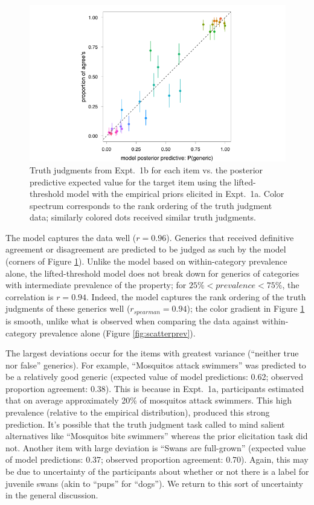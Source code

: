 \documentclass[10pt,letterpaper]{article}
\begin{document}
\begin{figure}
\centering
    \includegraphics[width=0.8\columnwidth]{tj_n100_tjVsPostpred}
    \caption{Truth judgments from Expt.~1b for each item vs. the posterior predictive expected value for the target item using the lifted-threshold model with the empirical priors elicited in Expt.~1a. Color spectrum corresponds to the rank ordering of the truth judgment data; similarly colored dots received similar truth judgments.}
  \label{fig:modeldataScatter}
\end{figure}

The model captures the data well ($r=0.96$). 
Generics that received definitive agreement or disagreement are predicted to be judged as such by the model (corners of Figure \ref{fig:modeldataScatter}). Unlike the model based on within-category prevalence alone, the lifted-threshold model does not break down for generics of categories with intermediate prevalence of the property; for $ 25\% < prevalence < 75\%$, the correlation is $r=0.94$. Indeed, the model captures the rank ordering of the truth judgments of these generics well ($r_{spearman} = 0.94$); the color gradient in Figure \ref{fig:modeldataScatter} is smooth, unlike what is observed when comparing the data against within-category prevalence alone (Figure \ref{fig:scatterprev}). 

The largest deviations occur for the items with greatest variance (``neither true nor false'' generics). For example, ``Mosquitos attack swimmers'' was predicted to be a relatively good generic (expected value of model predictions: 0.62; observed proportion agreement: 0.38). This is because in Expt.~1a, participants estimated that on average approximately 20\% of mosquitos attack swimmers. This high prevalence (relative to the empirical distribution), produced this strong prediction. It's possible that the truth judgment task called to mind salient alternatives like ``Mosquitos bite swimmers'' whereas the prior elicitation task did not. Another item with large deviation is ``Swans are full-grown'' (expected value of model predictions: 0.37; observed proportion agreement: 0.70). Again, this may be due to uncertainty of the participants about whether or not there is a label for juvenile swans (akin to ``pups'' for ``dogs''). We return to this sort of uncertainty in the general discussion.
\end{document}

